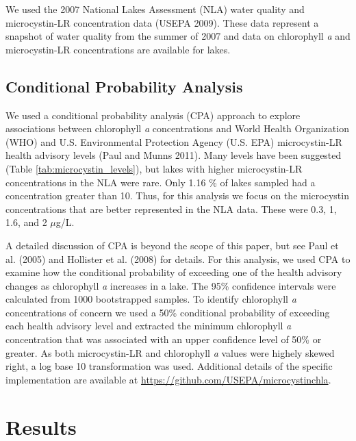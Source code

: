 \documentclass[11pt,]{article}
\begin{document}
We used the 2007 National Lakes Assessment (NLA) water quality and
microcystin-LR concentration data (USEPA 2009). These data represent a
snapshot of water quality from the summer of 2007 and data on
chlorophyll \emph{a} and microcystin-LR concentrations are available for
lakes.

\subsection{Conditional Probability
Analysis}\label{conditional-probability-analysis}

We used a conditional probability analysis (CPA) approach to explore
associations between chlorophyll \emph{a} concentrations and World
Health Organization (WHO) and U.S. Environmental Protection Agency (U.S.
EPA) microcystin-LR health advisory levels (Paul and Munns 2011). Many
levels have been suggested (Table \ref{tab:microcystin_levels}), but
lakes with higher microcystin-LR concentrations in the NLA were rare.
Only 1.16 \% of lakes sampled had a concentration greater than 10. Thus,
for this analysis we focus on the microcystin concentrations that are
better represented in the NLA data. These were 0.3, 1, 1.6, and 2
\(\mu\)g/L.

A detailed discussion of CPA is beyond the scope of this paper, but see
Paul et al. (2005) and Hollister et al. (2008) for details. For this
analysis, we used CPA to examine how the conditional probability of
exceeding one of the health advisory changes as chlorophyll \emph{a}
increases in a lake. The 95\% confidence intervals were calculated from
1000 bootstrapped samples. To identify chlorophyll \emph{a}
concentrations of concern we used a 50\% conditional probability of
exceeding each health advisory level and extracted the minimum
chlorophyll \emph{a} concentration that was associated with an upper
confidence level of 50\% or greater. As both microcystin-LR and
chlorophyll \emph{a} values were highely skewed right, a log base 10
transformation was used. Additional details of the specific
implementation are available at
\url{https://github.com/USEPA/microcystinchla}.

\section{Results}\label{results}
\end{document}
